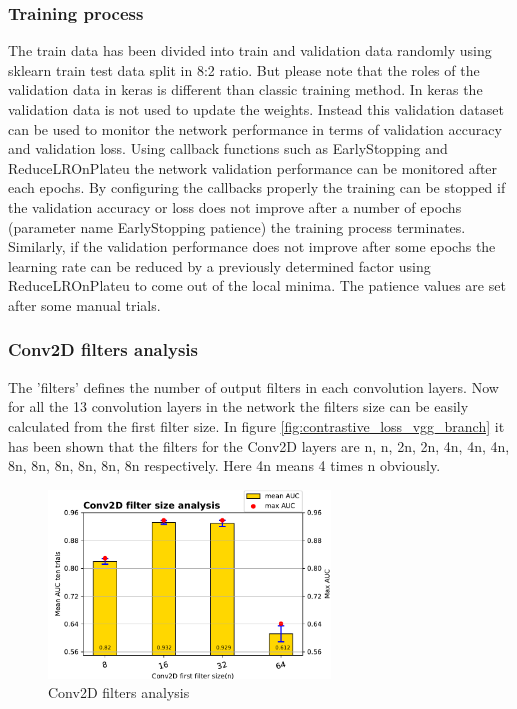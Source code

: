 \subsubsection{Training process}
The train data has been divided into train and validation data randomly using sklearn train test data split \cite{sklearnsplit} in 8:2 ratio. But please note that the roles of the validation data in keras 
is different than classic training method. In keras the validation data is not used to update the weights. Instead this validation dataset can be used to monitor the network performance in terms of 
validation accuracy and validation loss. Using callback functions such as EarlyStopping and ReduceLROnPlateu \cite{kerascallbacks} the network validation performance can be monitored after each epochs.
By configuring the callbacks properly the training can be stopped if the validation accuracy or loss does not improve after a number of epochs (parameter name EarlyStopping patience) the training process terminates.
Similarly, if the validation performance does not improve after some epochs the learning rate can be reduced by a previously determined factor using ReduceLROnPlateu to come out of the local minima. The patience values 
are set after some manual trials.
\subsubsection{Conv2D filters analysis}
The 'filters'\cite{kerasconv} defines the number of output filters in each convolution layers. Now for all the 13 convolution layers in the network the filters size can be easily calculated from the first filter size. In figure
\ref{fig:contrastive_loss_vgg_branch} it has been shown that the filters for the Conv2D layers are n, n, 2n, 2n, 4n, 4n, 4n, 8n, 8n, 8n, 8n, 8n, 8n respectively. Here 4n means 4 times n obviously. 
\begin{figure}[ht]
\centering
\includegraphics[height= 5cm]{images/contrastive/contrastive_loss_con2d_filter_bar}
\caption{Conv2D filters analysis}
\label{fig:contrastive_loss_con2d_filter_bar}
\end{figure}

